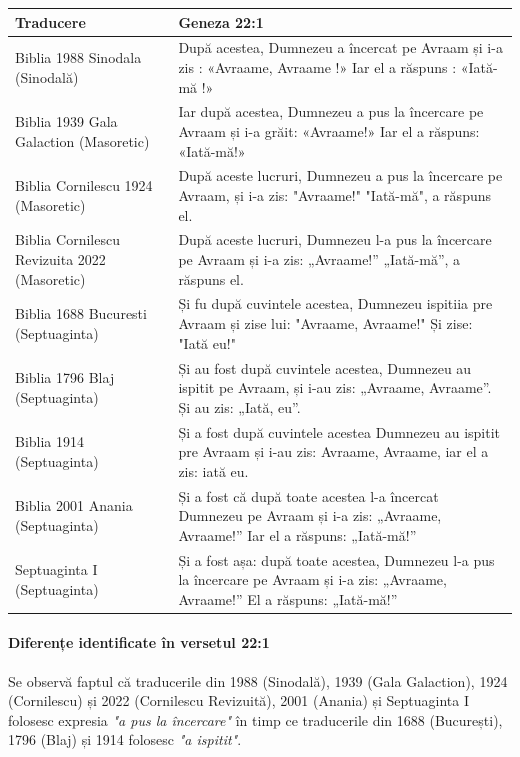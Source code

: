 \documentclass[12pt,a4paper]{article}
\begin{document}
\begin{longtable}{|p{3cm}|L|}
    \hline
    \textbf{Traducere}                           & \textbf{Geneza 22:1}                                                                                                                \\
    \hline
    Biblia 1988 Sinodala (Sinodală)              & După acestea, Dumnezeu a încercat pe Avraam și i-a zis : «Avraame, Avraame !» Iar el a răspuns : «Iată-mă !»                        \\
    \hline
    Biblia 1939 Gala Galaction (Masoretic)       & Iar după acestea, Dumnezeu a pus la încercare pe Avraam și i-a grăit: «Avraame!» Iar el a răspuns: «Iată-mă!»                       \\
    \hline
    Biblia Cornilescu 1924 (Masoretic)           & După aceste lucruri, Dumnezeu a pus la încercare pe Avraam, și i-a zis: "Avraame!" "Iată-mă", a răspuns el.                         \\
    \hline
    Biblia Cornilescu Revizuita 2022 (Masoretic) & După aceste lucruri, Dumnezeu l-a pus la încercare pe Avraam și i-a zis: „Avraame!” „Iată-mă”, a răspuns el.                        \\
    \hline
    Biblia 1688 Bucuresti (Septuaginta)          & Și fu după cuvintele acestea, Dumnezeu ispitiia pre Avraam și zise lui: "Avraame, Avraame!" Și zise: "Iată eu!"                     \\
    \hline
    Biblia 1796 Blaj (Septuaginta)               & Și au fost după cuvintele acestea, Dumnezeu au ispitit pe Avraam, și i-au zis: „Avraame, Avraame”. Și au zis: „Iată, eu”.           \\
    \hline
    Biblia 1914 (Septuaginta)                    & Și a fost după cuvintele acestea Dumnezeu au ispitit pre Avraam și i-au zis: Avraame, Avraame, iar el a zis: iată eu.               \\
    \hline
    Biblia 2001 Anania (Septuaginta)             & Și a fost că după toate acestea l-a încercat Dumnezeu pe Avraam și i-a zis: „Avraame, Avraame!” Iar el a răspuns: „Iată-mă!”        \\
    \hline
    Septuaginta I (Septuaginta)                  & Și a fost așa: după toate acestea, Dumnezeu l-a pus la încercare pe Avraam și i-a zis: „Avraame, Avraame!” El a răspuns: „Iată-mă!” \\
    \hline
\end{longtable}
\paragraph{Diferențe identificate în versetul 22:1}
Se observă faptul că traducerile din 1988 (Sinodală), 1939 (Gala Galaction),
1924 (Cornilescu) și 2022 (Cornilescu Revizuită), 2001 (Anania) și Septuaginta I folosesc expresia \emph{"a pus la încercare"}
în timp ce traducerile din 1688 (București), 1796 (Blaj) și 1914 folosesc \emph{"a ispitit"}.
\end{document}
